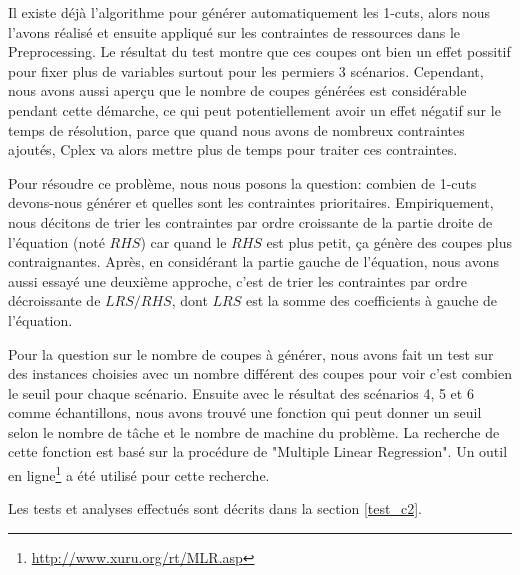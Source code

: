 Il existe déjà l'algorithme\cite{t2007enumeration} pour générer automatiquement les 1-cuts, alors nous l'avons réalisé et ensuite appliqué sur les contraintes de ressources dans le Preprocessing. Le résultat du test montre que ces coupes ont bien un effet possitif pour fixer plus de variables surtout pour les permiers 3 scénarios. Cependant, nous avons aussi aperçu que le nombre de coupes générées est considérable pendant cette démarche, ce qui peut potentiellement avoir un effet négatif sur le temps de résolution, parce que quand nous avons de nombreux contraintes ajoutés, Cplex va alors mettre plus de temps pour traiter ces contraintes.

Pour résoudre ce problème, nous nous posons la question: combien de 1-cuts devons-nous générer et quelles sont les contraintes prioritaires. Empiriquement, nous décitons de trier les contraintes par ordre croissante de la partie droite de l'équation (noté $RHS$) car quand le $RHS$ est plus petit, ça génère des coupes plus contraignantes. Après, en considérant la partie gauche de l'équation, nous avons aussi essayé une deuxième approche, c'est de trier les contraintes par ordre décroissante de $LRS/RHS$, dont $LRS$ est la somme des coefficients à gauche de l'équation.

Pour la question sur le nombre de coupes à générer, nous avons fait un test sur des instances choisies avec un nombre différent des coupes pour voir c'est combien le seuil pour chaque scénario. Ensuite avec le résultat des scénarios 4, 5 et 6 comme échantillons, nous avons trouvé une fonction qui peut donner un seuil selon le nombre de tâche et le nombre de machine du problème. La recherche de cette fonction est basé sur la procédure de "Multiple Linear Regression". Un outil en ligne\footnote{\url{http://www.xuru.org/rt/MLR.asp}} a été utilisé pour cette recherche.

Les tests et analyses effectués sont décrits dans la section \ref{test_c2}.

